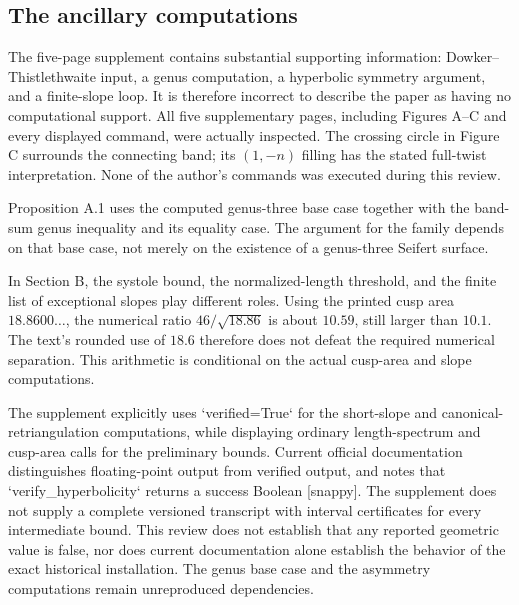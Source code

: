 \documentclass[10pt]{article}
\begin{document}
\subsection*{The ancillary computations}
The five-page supplement contains substantial supporting information: Dowker–Thistlethwaite input, a genus computation, a hyperbolic symmetry argument, and a finite-slope loop. It is therefore incorrect to describe the paper as having no computational support. All five supplementary pages, including Figures A–C and every displayed command, were actually inspected. The crossing circle in Figure C surrounds the connecting band; its \((1,-n)\) filling has the stated full-twist interpretation. None of the author’s commands was executed during this review.\par
Proposition A.1 uses the computed genus-three base case together with the band-sum genus inequality and its equality case. The argument for the family depends on that base case, not merely on the existence of a genus-three Seifert surface.\par
In Section B, the systole bound, the normalized-length threshold, and the finite list of exceptional slopes play different roles. Using the printed cusp area \(18.8600\ldots\), the numerical ratio \(46/\sqrt{18.86}\) is about \(10.59\), still larger than \(10.1\). The text’s rounded use of \(18.6\) therefore does not defeat the required numerical separation. This arithmetic is conditional on the actual cusp-area and slope computations.\par
The supplement explicitly uses `verified=True` for the short-slope and canonical-retriangulation computations, while displaying ordinary length-spectrum and cusp-area calls for the preliminary bounds. Current official documentation distinguishes floating-point output from verified output, and notes that `verify\_hyperbolicity` returns a success Boolean [snappy]. The supplement does not supply a complete versioned transcript with interval certificates for every intermediate bound. This review does not establish that any reported geometric value is false, nor does current documentation alone establish the behavior of the exact historical installation. The genus base case and the asymmetry computations remain unreproduced dependencies.\par
\end{document}
